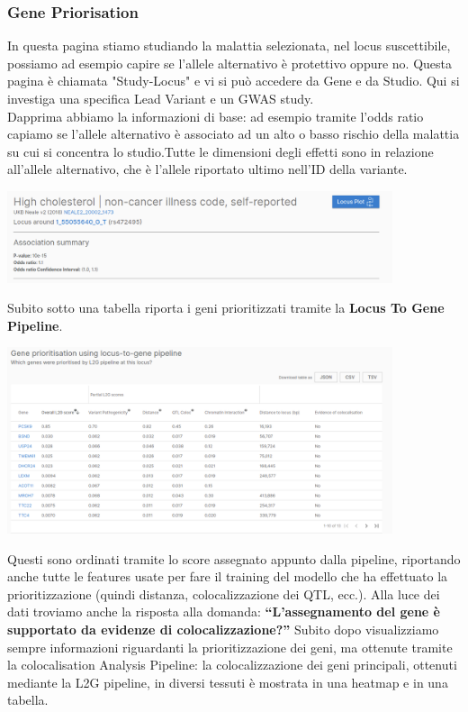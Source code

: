 \documentclass{article}
\begin{document}
\subsubsection{Gene Priorisation}
In questa pagina stiamo studiando la malattia selezionata, nel locus suscettibile, possiamo ad esempio capire se l'allele alternativo è protettivo oppure no.
Questa pagina è chiamata "Study-Locus" e vi si può accedere da Gene e da Studio. Qui si investiga una specifica Lead Variant e un GWAS study.\\
Dapprima abbiamo la informazioni di base: ad esempio tramite l’odds ratio capiamo se l’allele alternativo è associato ad un alto o basso rischio della malattia su cui si concentra lo studio.Tutte le dimensioni degli effetti sono in relazione all’allele alternativo, che è l’allele riportato ultimo nell’ID della variante.
\begin{center}
    \includegraphics[width=0.85\textwidth]{figures/StudyLocus.png}
\end{center}
Subito sotto una tabella riporta i geni prioritizzati tramite la \textbf{Locus To Gene Pipeline}.
\begin{center}
    \includegraphics[width=0.85\textwidth]{figures/StudyLocus2.png}
\end{center}
Questi sono ordinati tramite lo score assegnato appunto dalla pipeline, riportando anche tutte le features usate per fare il training del modello che ha effettuato la prioritizzazione (quindi distanza, colocalizzazione dei QTL, ecc.). Alla luce dei dati troviamo anche la risposta alla domanda: \textbf{“L’assegnamento del gene è supportato da evidenze di colocalizzazione?”}
Subito dopo visualizziamo sempre informazioni riguardanti la prioritizzazione dei geni, ma ottenute tramite la colocalisation Analysis Pipeline: la colocalizzazione dei geni principali, ottenuti mediante la L2G pipeline, in diversi tessuti è mostrata in una heatmap e in una tabella.
\end{document}
